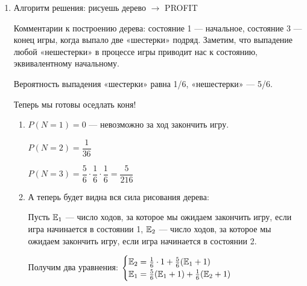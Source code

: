 \documentclass[12pt, a4paper]{article}\usepackage[]{graphicx}\usepackage[]{color}
\begin{document}
\begin{enumerate}
\item
Алгоритм решения: рисуешь дерево $\rightarrow$ PROFIT

\begin{center}


\end{center}

Комментарии к построению дерева: состояние 1 — начальное, состояние 3 — конец игры, когда выпало две «шестерки» подряд. Заметим, что выпадение любой «нешестерки» в процессе игры приводит нас к состоянию, эквивалентному начальному.

Вероятность выпадения «шестерки» равна 1/6, «нешестерки» — 5/6.

Теперь мы готовы оседлать коня!

\begin{enumerate}
\item $P(N = 1) = 0$ — невозможно за ход закончить игру.

$P(N = 2) = \dfrac{1}{36}$

$P(N = 3) = \dfrac{5}{6} \cdot \dfrac{1}{6} \cdot \dfrac{1}{6} = \dfrac{5}{216}$

\item А теперь будет видна вся сила рисования дерева:

Пусть $\mathbb{E}_1$ — число ходов, за которое мы ожидаем закончить игру, если игра начинается в состоянии 1, $\mathbb{E}_2$ — число ходов, за которое мы ожидаем закончить игру, если игра начинается в состоянии 2.

Получим два уравнения:
$\begin{cases} \mathbb{E}_2 = \frac{1}{6} \cdot 1 +  \frac{5}{6} (\mathbb{E}_1 + 1)   \\ \mathbb{E}_1 =  \frac{5}{6} (\mathbb{E}_1 + 1) + \frac{1}{6} ( \mathbb{E}_2 + 1) \end{cases} $


\end{enumerate}
\end{enumerate}
\end{document}
